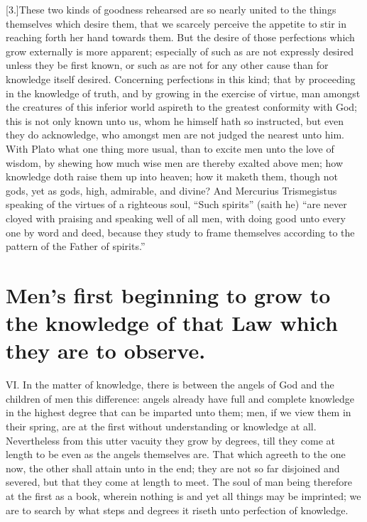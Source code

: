 [3.]These two kinds of goodness rehearsed are so nearly united to the things themselves which desire them, that we scarcely perceive the appetite to stir in reaching forth her hand towards them. But the desire of those perfections which grow externally is more apparent; especially of such as are not expressly desired unless they be first known, or such as are not for any other cause than for knowledge itself desired. Concerning perfections in this kind; that by proceeding in the knowledge of truth, and by growing in the exercise of virtue, man amongst the creatures of this inferior world aspireth to the greatest conformity with God; this is not only known unto us, whom he himself hath so instructed, but even they do acknowledge, who amongst men are not judged the nearest unto him. With Plato what one thing more usual, than to excite men unto the love of wisdom, by shewing how much wise men are thereby exalted above men; how knowledge doth raise them up into heaven; how it maketh them, though not gods, yet as gods, high, admirable, and divine? And Mercurius Trismegistus speaking of the virtues of a righteous soul, “Such spirits” (saith he) “are never cloyed with praising and speaking well of all men, with doing good unto every one by word and deed, because they study to frame themselves according to the pattern of the Father of spirits.”

\section*{Men’s first beginning to grow to the knowledge of that Law which they are to observe.}

VI. In the matter of knowledge, there is between the angels of God and the children of men this difference: angels already have full and complete knowledge in the highest degree that can be imparted unto them; men, if we view them in their spring, are at the first without understanding or knowledge at all. Nevertheless from this utter vacuity they grow by degrees, till they come at length to be even as the angels themselves are. That which agreeth to the one now, the other shall attain unto in the end; they are not so far disjoined and severed, but that they come at length to meet. The soul of man being therefore at the first as a book, wherein nothing is and yet all things may be imprinted; we are to search by what steps and degrees it riseth unto perfection of knowledge.

